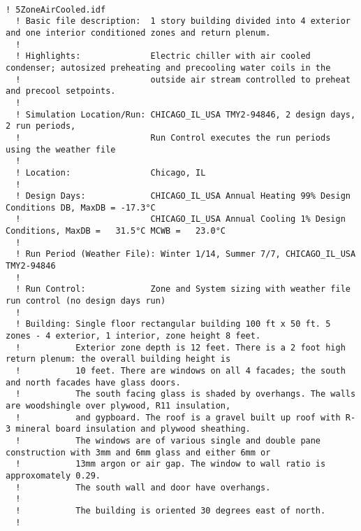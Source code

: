 \begin{lstlisting}

! 5ZoneAirCooled.idf
  ! Basic file description:  1 story building divided into 4 exterior and one interior conditioned zones and return plenum.
  !
  ! Highlights:              Electric chiller with air cooled condenser; autosized preheating and precooling water coils in the
  !                          outside air stream controlled to preheat and precool setpoints.
  !
  ! Simulation Location/Run: CHICAGO_IL_USA TMY2-94846, 2 design days, 2 run periods,
  !                          Run Control executes the run periods using the weather file
  !
  ! Location:                Chicago, IL
  !
  ! Design Days:             CHICAGO_IL_USA Annual Heating 99% Design Conditions DB, MaxDB = -17.3°C
  !                          CHICAGO_IL_USA Annual Cooling 1% Design Conditions, MaxDB =   31.5°C MCWB =   23.0°C
  !
  ! Run Period (Weather File): Winter 1/14, Summer 7/7, CHICAGO_IL_USA TMY2-94846
  !
  ! Run Control:             Zone and System sizing with weather file run control (no design days run)
  !
  ! Building: Single floor rectangular building 100 ft x 50 ft. 5 zones - 4 exterior, 1 interior, zone height 8 feet.
  !           Exterior zone depth is 12 feet. There is a 2 foot high return plenum: the overall building height is
  !           10 feet. There are windows on all 4 facades; the south and north facades have glass doors.
  !           The south facing glass is shaded by overhangs. The walls are woodshingle over plywood, R11 insulation,
  !           and gypboard. The roof is a gravel built up roof with R-3 mineral board insulation and plywood sheathing.
  !           The windows are of various single and double pane construction with 3mm and 6mm glass and either 6mm or
  !           13mm argon or air gap. The window to wall ratio is approxomately 0.29.
  !           The south wall and door have overhangs.
  !
  !           The building is oriented 30 degrees east of north.
  !



\end{lstlisting}
